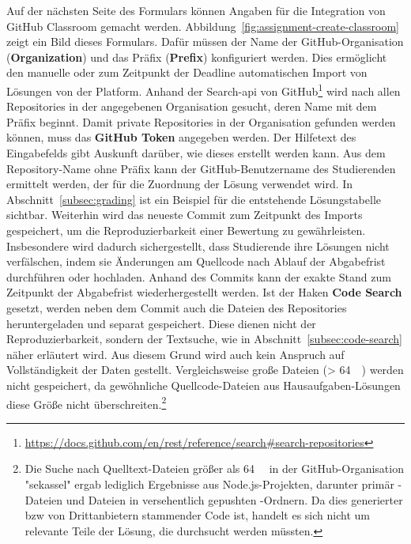 Auf der nächsten Seite des Formulars können Angaben für die Integration von GitHub Classroom gemacht werden.
Abbildung~\ref{fig:assignment-create-classroom} zeigt ein Bild dieses Formulars.
Dafür müssen der Name der GitHub-Organisation (\textbf{Organization}) und das Präfix (\textbf{Prefix}) konfiguriert werden.
Dies ermöglicht den manuelle oder zum Zeitpunkt der Deadline automatischen Import von Lösungen von der Platform.
Anhand der Search-\ac{api} von GitHub\footnote{
    \url{https://docs.github.com/en/rest/reference/search\#search-repositories}
} wird nach allen Repositories in der angegebenen Organisation gesucht, deren Name mit dem Präfix beginnt.
Damit private Repositories in der Organisation gefunden werden können, muss das \textbf{GitHub Token} angegeben werden.
Der Hilfetext des Eingabefelds gibt Auskunft darüber, wie dieses erstellt werden kann.
Aus dem Repository-Name ohne Präfix kann der GitHub-Benutzername des Studierenden ermittelt werden, der für die Zuordnung der Lösung verwendet wird.
In Abschnitt~\ref{subsec:grading} ist ein Beispiel für die entstehende Lösungstabelle sichtbar.
Weiterhin wird das neueste Commit zum Zeitpunkt des Imports gespeichert, um die Reproduzierbarkeit einer Bewertung zu gewährleisten.
Insbesondere wird dadurch sichergestellt, dass Studierende ihre Lösungen nicht verfälschen, indem sie Änderungen am Quellcode nach Ablauf der Abgabefrist durchführen oder hochladen.
Anhand des Commits kann der exakte Stand zum Zeitpunkt der Abgabefrist wiederhergestellt werden.
Ist der Haken \textbf{Code Search} gesetzt, werden neben dem Commit auch die Dateien des Repositories heruntergeladen und separat gespeichert.
Diese dienen nicht der Reproduzierbarkeit, sondern der Textsuche, wie in Abschnitt~\ref{subsec:code-search} näher erläutert wird.
Aus diesem Grund wird auch kein Anspruch auf Vollständigkeit der Daten gestellt.
Vergleichsweise große Dateien (> \SI{64}{\kibi\byte}) werden nicht gespeichert, da gewöhnliche Quellcode-Dateien aus Hausaufgaben-Lösungen diese Größe nicht überschreiten.\footnote{
    Die Suche nach Quelltext-Dateien größer als \SI{64}{\kibi\byte} in der GitHub-Organisation "sekassel" ergab lediglich Ergebnisse aus Node.js-Projekten, darunter primär -Dateien und Dateien in versehentlich gepushten -Ordnern.
    Da dies generierter \ac{bzw} von Drittanbietern stammender Code ist, handelt es sich nicht um relevante Teile der Lösung, die durchsucht werden müssten.
}

